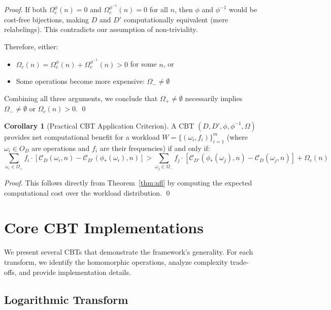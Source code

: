 \documentclass[11pt]{article}
\theoremstyle{definition}
\newtheorem{corollary}{Corollary}
\begin{document}
\begin{proof}
If both $\Omega_c^{\phi}(n) = 0$ and $\Omega_c^{\phi^{-1}}(n) = 0$ for all $n$, then $\phi$ and $\phi^{-1}$ would be cost-free bijections, making $D$ and $D'$ computationally equivalent (mere relabelings). This contradicts our assumption of non-triviality.

Therefore, either:
\begin{itemize}
\item $\Omega_c(n) = \Omega_c^{\phi}(n) + \Omega_c^{\phi^{-1}}(n) > 0$ for some $n$, or
\item Some operations become more expensive: $\Omega_- \neq \emptyset$
\end{itemize}

Combining all three arguments, we conclude that $\Omega_+ \neq \emptyset$ necessarily implies $\Omega_- \neq \emptyset$ or $\Omega_c(n) > 0$. \qed
\end{proof}

\begin{corollary}[Practical CBT Application Criterion]
\label{cor:practical}
A CBT $(D, D', \phi, \phi^{-1}, \Omega)$ provides net computational benefit for a workload $W = \{(\omega_i, f_i)\}_{i=1}^m$ (where $\omega_i \in O_D$ are operations and $f_i$ are their frequencies) if and only if:
\begin{equation}
\sum_{\omega_i \in \Omega_+} f_i \cdot [\mathcal{C}_D(\omega_i, n) - \mathcal{C}_{D'}(\phi_*(\omega_i), n)] > 
\sum_{\omega_j \in \Omega_-} f_j \cdot [\mathcal{C}_{D'}(\phi_*(\omega_j), n) - \mathcal{C}_D(\omega_j, n)] + \Omega_c(n)
\end{equation}
\end{corollary}

\begin{proof}
This follows directly from Theorem~\ref{thm:nfl} by computing the expected computational cost over the workload distribution. \qed
\end{proof}

\section{Core CBT Implementations}
\label{sec:implementations}

We present several CBTs that demonstrate the framework's generality. For each transform, we identify the homomorphic operations, analyze complexity trade-offs, and provide implementation details.

\subsection{Logarithmic Transform}
\end{document}
